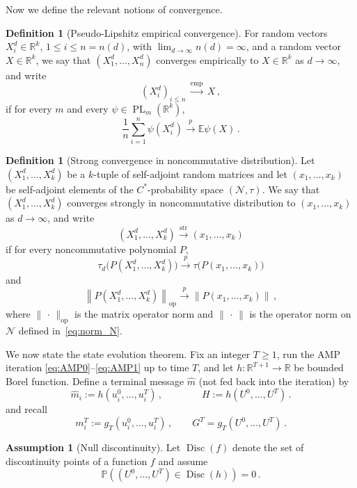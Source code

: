 \documentclass[11pt]{article}
\theoremstyle{definition}
\newtheorem{definition}[theorem]{Definition}
\newtheorem{assumption}[theorem]{Assumption}
\theoremstyle{remark}
\numberwithin{equation}{section}
\numberwithin{theorem}{section}
\newcommand{\R}{\mathbb R}
\newcommand{\E}{\mathbb E}
\newcommand{\Prob}{\mathbb P}
\newcommand{\op}{\mathrm{op}}
\newcommand{\norm}[1]{\left\lVert #1\right\rVert}
\newcommand{\taud}{\tau_d}
\newcommand{\taup}{\tau}
\newcommand{\xto}{\xrightarrow}
\newcommand{\PL}{\operatorname{PL}}
\begin{document}
Now we define the relevant notions of convergence.

\begin{definition}[Pseudo-Lipshitz empirical convergence]\label{def:emp-conv}
For random vectors $X_i^d\in\R^k$, $1\le i\le n = n(d)$, with $\lim_{d \to \infty} n(d) =\infty$, and a random vector $X\in\R^k$, we say that $(X_1^d,\ldots,X_n^d)$ converges empirically to $X \in \R^k$ as $d \to \infty$, and  
write
\[
  (X^d_i)_{i\le n}\,\xrightarrow{\mathrm{emp}}\, X\,,
\]
 if for every $m$ and every  $\psi\in \PL_m(\R^k)$,
\[
\frac1n\sum_{i=1}^n\psi(X_i^d)\xrightarrow{p}\E\psi(X)\,.
\]
\end{definition}

\begin{definition}[Strong convergence in noncommutative distribution]\label{def:strong}
Let $(X_1^d,\ldots,X_k^d)$ be a $k$-tuple of self-adjoint random matrices and let $(x_1,\ldots,x_k)$ be self-adjoint elements of the $C^*$-probability space $(\mathcal N,\taup)$.  We say that $(X_1^d,\ldots,X_k^d)$ converges strongly in noncommutative distribution to $(x_1,\ldots,x_k)$ as $d \to \infty$, and write
\[
  (X_1^d,\ldots,X_k^d) \xrightarrow{\mathrm{str}} (x_1,\ldots,x_k)
\]
if for every noncommutative polynomial $P$,
\[
  \taud\bigl(P(X_1^d,\ldots,X_k^d)\bigr)\xto{p}
  \taup\bigl(P(x_1,\ldots,x_k)\bigr)
\]
and
\[
  \norm{P(X_1^d,\ldots,X_k^d)}_{\op}\xto{p}
  \norm{P(x_1,\ldots,x_k)}\,,
\]
 where $\|\,\cdot\,\|_{\op}$ is the matrix operator norm and $\|\,\cdot\,\|$ is the operator norm on $\mathcal{N}$ defined in~\eqref{eq:norm_N}. 
\end{definition}


We now state the state evolution theorem. Fix an integer $T\ge1$, run the AMP iteration \eqref{eq:AMP0}--\eqref{eq:AMP1} up to time $T$, and let
$h:\R^{T+1}\to\R$ be bounded Borel function.  Define a terminal
message $\widehat{m}$ (not fed back into the iteration) by
\begin{equation}\label{eq:terminal-comparison-readouts}
 \widehat m_i:=h(u_i^0,\ldots,u_i^T)\,,
 \qquad\qquad
 H:=h(U^0,\ldots,U^T)\,.
 \end{equation}
and recall
\[  m_i^T:=g_T(u_i^0,\ldots,u_i^T)\,, \qquad G^T = g_T(U^0,\ldots,U^T)\,.\]

\begin{assumption}[Null discontinuity]
\label{ass:zero-discontinuity}
Let $\operatorname{Disc}(f)$ denote the set of discontinuity points of a function $f$ and assume
\begin{equation}\label{eq:terminal-comparison-null}
 \Prob\left(  (U^0,\ldots,U^T) \in\operatorname{Disc}(h) \right)=0\,.
\end{equation}
\end{assumption}
\end{document}
